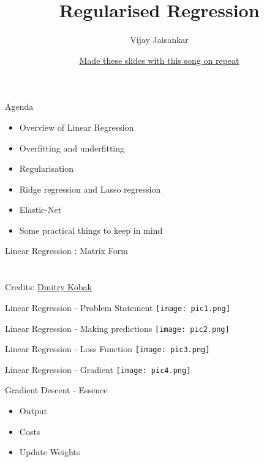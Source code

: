 \documentclass{beamer}
\title[ML]{Regularised Regression}
\author{Vijay Jaisankar}
\institute{Teaching Assistant}
\date{\href{https://www.youtube.com/watch?v=dQw4w9WgXcQ}{Made these slides with this song on repeat}}
\begin{document}
\begin{frame}
\titlepage
\end{frame}



\begin{frame}
    Agenda  
    \begin{itemize}
        \item Overview of Linear Regression
        \item Overfitting and underfitting
        \item Regularisation
        \item Ridge regression and Lasso regression
        \item Elastic-Net
        \item Some practical things to keep in mind
    \end{itemize}
\end{frame}

\begin{frame}
    Linear Regression : Matrix Form
    \\
    \\ 
    \\
    Credits: \href{https://dkobak.github.io/}{Dmitry Kobak}
\end{frame}

\begin{frame}{Linear Regression - Problem Statement}
\texttt{[image: pic1.png]}
\end{frame}

\begin{frame}{Linear Regression - Making predictions}
    \texttt{[image: pic2.png]}
\end{frame}

\begin{frame}{Linear Regression - Loss Function}
    \texttt{[image: pic3.png]}
\end{frame}

\begin{frame}{Linear Regression - Gradient}
    \texttt{[image: pic4.png]}
\end{frame}

\begin{frame}{Gradient Descent - Essence}
    \begin{itemize}
        \item Output
        \item Costs 
        \item Update Weights
    \end{itemize}
\end{frame}
\end{document}
